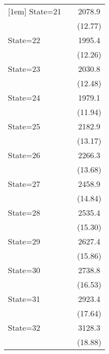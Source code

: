 {\begin{longtable}{l*{2}{c}}
[1em]
State=21            &                     &      2078.9\sym{***}\\
                    &                     &     (12.77)         \\
[1em]
State=22            &                     &      1995.4\sym{***}\\
                    &                     &     (12.26)         \\
[1em]
State=23            &                     &      2030.8\sym{***}\\
                    &                     &     (12.48)         \\
[1em]
State=24            &                     &      1979.1\sym{***}\\
                    &                     &     (11.94)         \\
[1em]
State=25            &                     &      2182.9\sym{***}\\
                    &                     &     (13.17)         \\
[1em]
State=26            &                     &      2266.3\sym{***}\\
                    &                     &     (13.68)         \\
[1em]
State=27            &                     &      2458.9\sym{***}\\
                    &                     &     (14.84)         \\
[1em]
State=28            &                     &      2535.4\sym{***}\\
                    &                     &     (15.30)         \\
[1em]
State=29            &                     &      2627.4\sym{***}\\
                    &                     &     (15.86)         \\
[1em]
State=30            &                     &      2738.8\sym{***}\\
                    &                     &     (16.53)         \\
[1em]
State=31            &                     &      2923.4\sym{***}\\
                    &                     &     (17.64)         \\
[1em]
State=32            &                     &      3128.3\sym{***}\\
                    &                     &     (18.88)         \\

\end{longtable}}
